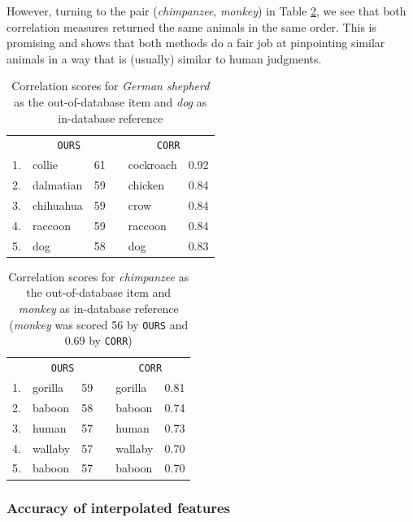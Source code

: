 \documentclass[11pt,a4paper]{article}
\begin{document}
However, turning to the pair (\textit{chimpanzee}, \textit{monkey}) in Table \ref{tab:corr2}, we see that both correlation measures returned the same animals in the same order. 
This is promising and shows that both methods do a fair job at pinpointing similar animals in a way that is (usually) similar to human judgments.

\begin{table}[]
    \centering
    \begin{tabular}{clcclc}
    \toprule
    & \multicolumn{2}{c}{\texttt{OURS}} && \multicolumn{2}{c}{\texttt{CORR}} \\
    \cmidrule{2-3} \cmidrule{5-6}
    1. & collie & 61 && cockroach & 0.92 \\
    2. & dalmatian & 59 && chicken & 0.84 \\
    3. & chihuahua & 59 && crow & 0.84 \\
    4. & raccoon & 59 && raccoon & 0.84 \\
    5. & dog & 58 && dog & 0.83 \\
    \bottomrule
    \end{tabular}
\caption{Correlation scores for \textit{German shepherd} as the out-of-database item and \textit{dog} as in-database reference}
\label{tab:corr1}
\end{table}

\begin{table}[]
    \centering
    \begin{tabular}{clcclc}
    \toprule
    & \multicolumn{2}{c}{\texttt{OURS}} && \multicolumn{2}{c}{\texttt{CORR}} \\
    \cmidrule{2-3} \cmidrule{5-6}
    1. & gorilla & 59 && gorilla & 0.81 \\
    2. & baboon & 58 && baboon & 0.74 \\
    3. & human & 57 && human & 0.73 \\
    4. & wallaby & 57 && wallaby & 0.70 \\
    5. & baboon & 57 && baboon & 0.70 \\
    \bottomrule
    \end{tabular}
\caption{Correlation scores for \textit{chimpanzee} as the out-of-database item and \textit{monkey} as in-database reference (\textit{monkey} was scored 56 by \texttt{OURS} and 0.69 by \texttt{CORR})}
\label{tab:corr2}
\end{table}

\subsubsection{Accuracy of interpolated features}
\end{document}
